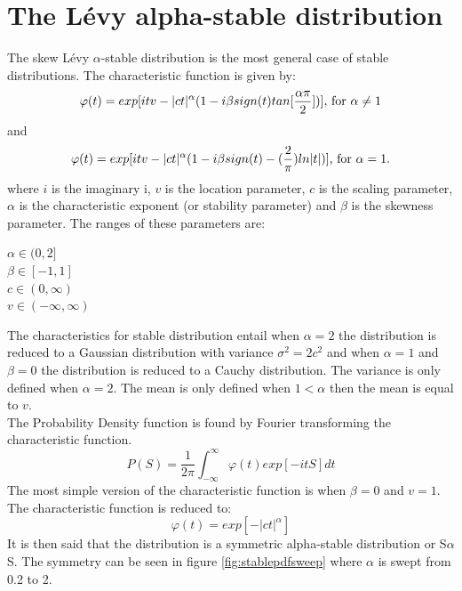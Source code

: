 \section{The Lévy alpha-stable distribution}
The skew Lévy $\alpha$-stable distribution is the most general case of stable distributions. The characteristic function is given by:
\begin{equation}
\varphi (t) = exp[itv - |ct|^{\alpha} (1-i\beta sign(t) tan[\frac{\alpha \pi}{2}])] $, for $ \alpha \neq 1
\end{equation}
and
\begin{equation}
\varphi (t) = exp[itv - |ct|^{\alpha} (1-i\beta sign(t) -(\frac{2}{\pi})ln|t|)] $, for $ \alpha = 1.
\end{equation}
where $i$ is the imaginary i, $v$ is the location parameter, $c$ is the scaling parameter, $\alpha$ is the characteristic exponent (or stability parameter) and $\beta$ is the skewness parameter. The ranges of these parameters are:\\
\begin{center}
$\alpha \in (0, 2]$\\
$\beta \in [-1, 1]$\\
$c \in (0, \infty)$\\
$v \in (-\infty, \infty)$\\
\end{center}
The characteristics for stable distribution entail when $\alpha = 2$ the distribution is reduced to a Gaussian distribution with variance $\sigma^2 = 2c^2$ and when $\alpha = 1$ and $\beta = 0$ the distribution is reduced to a Cauchy distribution. The variance is only defined when $\alpha = 2$. The mean is only defined when $1 < \alpha $ then the mean is equal to $v$.\\
The Probability Density function is found by Fourier transforming the characteristic function.\\
\begin{equation}
P(S) = \frac{1}{2\pi}\int_{-\infty}^{\infty} \varphi(t) exp[-itS] dt
\end{equation}
The most simple version of the characteristic function is when $\beta = 0$ and $v = 1$. The characteristic function is reduced to:
\begin{equation}
\varphi (t) = exp[- |ct|^{\alpha}]
\label{eq:reducedcharfunc}
\end{equation}
It is then said that the distribution is a symmetric alpha-stable distribution or S$\alpha$S. The symmetry can be seen in figure \ref{fig:stablepdfsweep} where $\alpha$ is swept from 0.2 to 2. 
